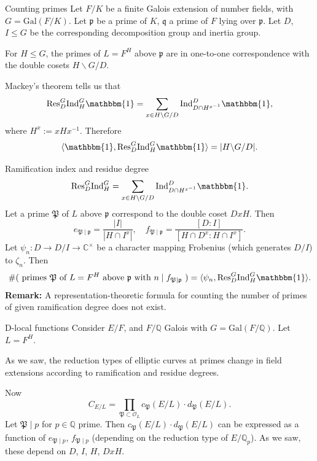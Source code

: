 \documentclass{beamer}
\newcommand{\Gal}{\mathrm{Gal}}
\newcommand{\trivial}{\mathbbm{1}}
\newcommand{\Ind}{\mathrm{Ind}}
\newcommand{\Res}{\mathrm{Res}}
\newcommand{\bQ}{\mathbb{Q}}
\newcommand{\bC}{\mathbb{C}}
\newcommand{\fP}{\mathfrak{P}}
\newcommand{\fp}{\mathfrak{p}}
\newcommand{\fq}{\mathfrak{q}}
\newcommand{\cO}{\mathcal{O}}
\theoremstyle{plain}
\begin{document}
\begin{frame}{Counting primes}
    Let $F / K$ be a finite Galois extension of number fields, with $G = \Gal(F / K)$. \pause Let $\fp$ be a prime of $K$, $\fq$ a prime of $F$ lying over $\fp$. Let $D$, $I \leq G$ be the corresponding decomposition group and inertia group. \pause 
    
    \begin{lemma}    
    For $H \leq G$, the primes of $L = F^H$ above $\fp$ are in one-to-one correspondence with the double cosets $H  \backslash G / D$. 
    \end{lemma} \pause

    \vspace{1em}
    Mackey's theorem tells us that 
    \[ \Res_D^G \Ind_H^G  \trivial = \sum_{x \in H\backslash G / D} \Ind_{D \cap H^{x^{-1}}}^D \trivial, \]
    where $H^x := x H x^{-1}$. \pause Therefore
    \[ \langle \trivial, \Res_D^G \Ind_H^G \trivial \rangle = | H \backslash G / D|.\]
\end{frame}

\begin{frame}{Ramification index and residue degree}
    \[ \Res_D^G \Ind_H^G = \sum_{x \in H\backslash G / D} \Ind_{D \cap H^{x^{-1}}}^D \trivial. \]
    Let a prime $\fP$ of $L$ above $\fp$ correspond to the double coset $D x H$. \pause Then 
    \[ e_{\fP \mid \fp} = \frac{|I|}{|H \cap I^{x}|}, \quad  f_{\fP \mid \fp} = \frac{[D : I]}{[H \cap D^{x} : H \cap I^x]}.\] \pause 
    Let $\psi_n \colon D \to D / I \to \bC^{\times}$ be a character mapping Frobenius (which generates $D/ I$) to $\zeta_n$. Then 
    \[ \# (\text{ primes $\fP$ of $L = F^H$ above $\fp$ with $n \mid f_{\fP \mid \fp}$ }) = \langle \psi_n , \Res_D^G \Ind_H^G \trivial\rangle.  \] \pause 
    \textbf{Remark:}
        A representation-theoretic formula for counting the number of primes of given ramification degree does not exist. 
\end{frame}

\begin{frame}{D-local functions}
    Consider $E / F$, and $F / \bQ$ Galois with $G = \Gal(F / \bQ)$. Let $L = F^H$.
    
    As we saw, the reduction types of elliptic curves at primes change in field extensions according to ramification and residue degrees.\pause 

    Now $$C_{E / L} = \prod_{\fP \subset \cO_L} c_{\fP}(E / L) \cdot d_{\fP}(E / L).$$ 
    Let $\fP \mid p$ for $p \in \bQ$ prime. \pause Then $c_{\fP}(E / L) \cdot d_{\fP}(E / L)$ can be expressed as a function of $e_{\fP \mid p}$, $f_{\fP \mid p}$ (depending on the reduction type of $E / \bQ_p$). \pause As we saw, these depend on $D$, $I$, $H$, $DxH$. 
\end{frame}
\end{document}
